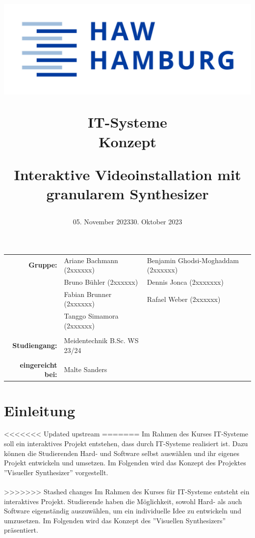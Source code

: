 \documentclass[12pt]{scrartcl}%
\title{
\begin{flushright}
 \includegraphics[scale=0.5]{HAW_Marke_RGB_300dpi.jpg}
\end{flushright}

\vspace{3cm}

IT-Systeme\\
Konzept
 
\vspace{3cm}

\LARGE Interaktive Videoinstallation mit\\
granularem Synthesizer
}
\date{05.  November 2023}
\date{30.  Oktober 2023} %
\theoremstyle{nonumberplain}
\begin{document}
\begin{titlepage}


\maketitle %


\vfill 

\begin{flushleft}
\begin{tabular}{rlll}
\textbf{Gruppe:} & Ariane Bachmann (2xxxxxx) & Benjamin Ghodsi-Moghaddam (2xxxxxx) & \hspace{5cm} \\
 & Bruno Bühler (2xxxxxx) & Dennis Jonca (2xxxxxxx) & \hspace{5cm} \\
 & Fabian Brunner (2xxxxxx) & Rafael Weber (2xxxxxx) & \hspace{5cm} \\
& Tanggo Simamora (2xxxxxx) & & \hspace{5cm} \\\\
\textbf{Studiengang:} & Meidentechnik B.Sc. WS 23/24 & \hspace{5cm} \\\\
\textbf{eingereicht bei:} & Malte Sanders & \hspace{5cm} \\ 
\end{tabular}
\end{flushleft}



\end{titlepage}

\tableofcontents


\newpage

\section{Einleitung}

<<<<<<< Updated upstream
=======
Im Rahmen des Kurses IT-Systeme soll ein interaktives Projekt entstehen, dass durch IT-Systeme realisiert ist. Dazu können die Studierenden Hard- und Software selbst auswählen und ihr eigenes Projekt entwickeln und umsetzen. Im Folgenden wird das Konzept des Projektes ''Visueller Synthesizer'' vorgestellt.\\\\
>>>>>>> Stashed changes
Im Rahmen des Kurses für IT-Systeme entsteht ein interaktives Projekt. Studierende haben die Möglichkeit, sowohl Hard- als auch Software eigenständig auszuwählen, um ein individuelle Idee zu entwickeln und umzusetzen. Im Folgenden wird das Konzept des ''Visuellen Synthesizers'' präsentiert.
\end{document}
